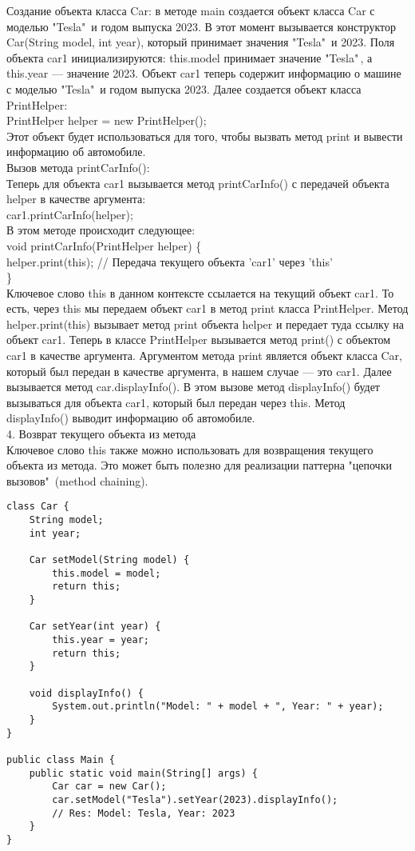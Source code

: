 Создание объекта класса Car: в методе main создается объект класса Car с моделью "Tesla"\, и годом выпуска 2023. В этот момент вызывается конструктор Car(String model, int year), который принимает значения "Tesla"\, и 2023. Поля объекта car1 инициализируются: this.model принимает значение "Tesla"\,, а this.year — значение 2023. Объект car1 теперь содержит информацию о машине с моделью "Tesla"\, и годом выпуска 2023. Далее создается объект класса PrintHelper: \\
PrintHelper helper = new PrintHelper(); \\
Этот объект будет использоваться для того, чтобы вызвать метод print и вывести информацию об автомобиле. \\
Вызов метода printCarInfo(): \\
Теперь для объекта car1 вызывается метод printCarInfo() с передачей объекта helper в качестве аргумента: \\
car1.printCarInfo(helper); \\
В этом методе происходит следующее: \\
void printCarInfo(PrintHelper helper) \{ \\
    helper.print(this);  // Передача текущего объекта 'car1' через 'this' \\
\} \\
Ключевое слово this в данном контексте ссылается на текущий объект car1. То есть, через this мы передаем объект car1 в метод print класса PrintHelper. Метод helper.print(this) вызывает метод print объекта helper и передает туда ссылку на объект car1. Теперь в классе PrintHelper вызывается метод print() с объектом car1 в качестве аргумента. Аргументом метода print является объект класса Car, который был передан в качестве аргумента, в нашем случае — это car1. Далее вызывается метод car.displayInfo(). В этом вызове метод displayInfo() будет вызываться для объекта car1, который был передан через this. Метод displayInfo() выводит информацию об автомобиле. \\
4. Возврат текущего объекта из метода \\
Ключевое слово this также можно использовать для возвращения текущего объекта из метода. Это может быть полезно для реализации паттерна "цепочки вызовов"\, (method chaining). \\
\begin{lstlisting}
class Car {
    String model;
    int year;
    
    Car setModel(String model) {
        this.model = model;
        return this; 
    }
    
    Car setYear(int year) {
        this.year = year;
        return this; 
    }
    
    void displayInfo() {
        System.out.println("Model: " + model + ", Year: " + year);
    }
}

public class Main {
    public static void main(String[] args) {
        Car car = new Car();
        car.setModel("Tesla").setYear(2023).displayInfo();  
        // Res: Model: Tesla, Year: 2023
    }
}
\end{lstlisting}
